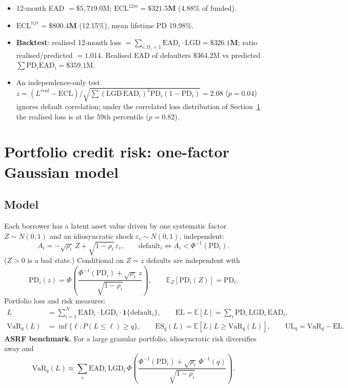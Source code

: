 \documentclass[11pt,a4paper]{article}
\newcommand{\PD}{\mathrm{PD}}
\newcommand{\LGD}{\mathrm{LGD}}
\newcommand{\EAD}{\mathrm{EAD}}
\newcommand{\ECL}{\mathrm{ECL}}
\newcommand{\VaR}{\mathrm{VaR}}
\newcommand{\ES}{\mathrm{ES}}
\newcommand{\E}{\mathbb{E}}
\newcommand{\1}{\mathbf{1}}
\begin{document}
\begin{keybox}
\begin{itemize}[leftmargin=*,itemsep=1pt]
\item 12-month EAD $=\$5{,}719.0$M; $\ECL^{12m}=\mathbf{\$321.5M}$ (4.88\% of funded).
\item $\ECL^{life}=\mathbf{\$800.4M}$ (12.15\%), mean lifetime PD 19.98\%.
\item \textbf{Backtest}: realised 12-month loss $=\sum_{i:D_i=1}\EAD_i\cdot\LGD=\mathbf{\$326.1M}$; ratio realised/predicted $=1.014$. Realised EAD of defaulters \$364.2M vs predicted $\sum\PD_i\EAD_i=\$359.1$M.
\item An independence-only test $z=(L^{real}-\ECL)/\sqrt{\sum(\LGD\,\EAD_i)^2\PD_i(1-\PD_i)}=2.08$ ($p=0.04$) ignores default correlation; under the correlated loss distribution of Section~\ref{sec:port} the realised loss is at the 59th percentile ($p=0.82$).
\end{itemize}
\end{keybox}

\section{Portfolio credit risk: one-factor Gaussian model}\label{sec:port}
\subsection{Model}
Each borrower has a latent asset value driven by one systematic factor $Z\sim N(0,1)$ and an idiosyncratic shock $\varepsilon_i\sim N(0,1)$, independent:
\begin{equation}
A_i=-\sqrt{\rho_i}\,Z+\sqrt{1-\rho_i}\,\varepsilon_i,\qquad \text{default}_i\iff A_i<\Phi^{-1}(\PD_i).
\end{equation}
($Z>0$ is a bad state.) Conditional on $Z=z$ defaults are independent with
\begin{equation}
\PD_i(z)=\Phi\!\left(\frac{\Phi^{-1}(\PD_i)+\sqrt{\rho_i}\,z}{\sqrt{1-\rho_i}}\right),\qquad \E_Z[\PD_i(Z)]=\PD_i .
\end{equation}
Portfolio loss and risk measures:
\begin{align}
L&=\sum_{i=1}^{N}\EAD_i\cdot\LGD_i\cdot\1\{\text{default}_i\},\qquad \mathrm{EL}=\E[L]=\sum_i\PD_i\,\LGD_i\,\EAD_i,\\
\VaR_q(L)&=\inf\{\ell:P(L\le\ell)\ge q\},\qquad \ES_q(L)=\E[L\mid L\ge\VaR_q(L)],\qquad \mathrm{UL}_q=\VaR_q-\mathrm{EL}.
\end{align}
\textbf{ASRF benchmark.} For a large granular portfolio, idiosyncratic risk diversifies away and
\begin{equation}
\VaR_q(L)\approx\sum_i\EAD_i\,\LGD_i\,\Phi\!\left(\frac{\Phi^{-1}(\PD_i)+\sqrt{\rho_i}\,\Phi^{-1}(q)}{\sqrt{1-\rho_i}}\right).
\end{equation}
\end{document}
